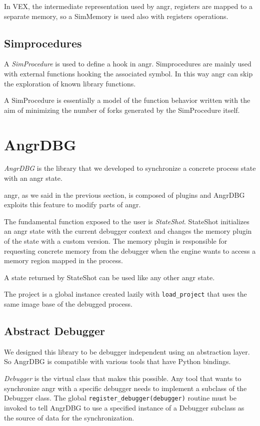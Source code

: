 In VEX, the intermediate representation used by angr, registers are mapped to a separate memory, so a SimMemory is used also with registers operations.

\subsection{Simprocedures}

A {\em SimProcedure} is used to define a hook in angr. Simprocedures are mainly used with external functions hooking the associated symbol. In this way angr can skip the exploration of known library functions.

A SimProcedure is essentially a model of the function behavior written with the aim of minimizing the number of forks generated by the SimProcedure itself.

\section{AngrDBG}

{\em AngrDBG} is the library that we developed to synchronize a concrete process state with an angr state.

angr, as we said in the previous section, is composed of plugins and AngrDBG exploits this feature to modify parts of angr.

The fundamental function exposed to the user is {\em StateShot}. StateShot initializes an angr state with the current debugger context and changes the memory plugin of the state with a custom version.
The memory plugin is responsible for requesting concrete memory from the debugger when the engine wants to access a memory region mapped in the process.

A state returned by StateShot can be used like any other angr state.

The project is a global instance created lazily with \verb|load_project| that uses the same image base of the debugged process.

\subsection{Abstract Debugger}

We designed this library to be debugger independent using an abstraction layer. So AngrDBG is compatible with various tools that have Python bindings.

{\em Debugger} is the virtual class that makes this possible. Any tool that wants to synchronize angr with a specific debugger needs to implement a subclass of the Debugger class.
The global \verb|register_debugger(debugger)| routine must be invoked to tell AngrDBG to use a specified instance of a Debugger subclass as the source of data for the synchronization.

